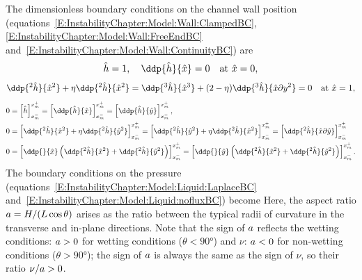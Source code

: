The dimensionless boundary conditions on the channel wall position (equations~\eqref{E:InstabilityChapter:Model:Wall:ClampedBC}, \eqref{E:InstabilityChapter:Model:Wall:FreeEndBC} and~\eqref{E:InstabilityChapter:Model:Wall:ContinuityBC}) are
\begin{equation}\label{E:InstabilityChapter:Modelling:NonDim:ClampedBC}
\hat{h} = 1, \quad \ddp{\hat{h}}{\hat{x}} = 0 \quad \text{at}~ \hat{x} = 0,
\end{equation}
\begin{equation}\label{E:InstabilityChapter:Modelling:NonDim:FreeBC}
\ddp{^2 \hat{h}}{ \hat{x}^2}  + \poisson \ddp{^2 \hat{h}}{\hat{x}^2} =  \ddp{^3 \hat{h}}{ \hat{x} ^3}  + (2-\poisson) \ddp{^3 \hat{h}}{\hat{x}\partial \y^2}=0 \quad \text{at}~ \hat{x} = 1,
\end{equation}
\begin{align}\label{E:InstabilityChapter:Modelling:NonDim:ContinuityBC1}
0 & =\left[ \hat{h} \right]_{x_m^-}^{x_m^+} = \left[\ddp{\hat{h}}{\hat{x}}\right] _{x_m^-}^{x_m^+}  = \left[\ddp{\hat{h}}{\hat{y}} \right]_{x_m^-}^{x_m^+}  ,\\
0 &=  \left[\ddp{^2 \hat{h}}{\hat{x}^2} +\poisson \ddp{^2 \hat{h}}{\hat{y}^2}  \right]_{x_m^-}^{x_m^+} = \left[\ddp{^2 \hat{h}}{\hat{y}^2} +\poisson \ddp{^2 \hat{h}}{\hat{x}^2}  \right]_{x_m^-}^{x_m^+}  = \left[\ddp{^2 \hat{h}}{\hat{x} \partial \hat{y}}  \right]_{x_m^-}^{x_m^+}  \label{E:InstabilityChapter:Modelling:NonDim:ContinuityBC2}
\\
0& = \left[\ddp{}{\hat{x}} \left(\ddp{^2 \hat{h}}{\hat{x}^2} + \ddp{^2 \hat{h}}{\hat{y} ^2}\right) \right]_{x_m^-}^{x_m^+}  = \left[\ddp{}{\hat{y}} \left(\ddp{^2 \hat{h}}{\hat{x}^2} + \ddp{^2 \hat{h}}{\hat{y} ^2}\right) \right]_{x_m^-}^{x_m^+}  .
\end{align}
The boundary conditions on the pressure (equations~\eqref{E:InstabilityChapter:Model:Liquid:LaplaceBC} and~\eqref{E:InstabilityChapter:Model:Liquid:nofluxBC}) become
Here, the aspect ratio $a = H/(L \cos \theta)$ arises as the ratio between the typical radii of curvature in the transverse and in-plane directions. Note that the sign of $a$ reflects the wetting conditions:  $a >0$ for wetting conditions ($\theta < 90\si{\degree}$) and $\nu$:   $a <0$ for non-wetting conditions ($\theta > 90\si{\degree}$); the sign of $a$ is always the same as the sign of $\nu$, so their ratio $\nu/a >0$.

